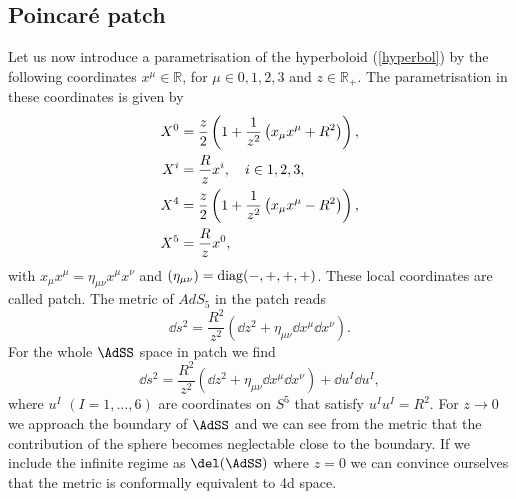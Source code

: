 \subsection{Poincaré patch}\label{p_patch}
Let us now introduce a parametrisation of the hyperboloid (\ref{hyperbol}) by the following coordinates $x^{\mu} \in \mathbb{R}$, for $\mu \in {0,1,2,3}$ and $z \in \mathbb{R}_{+}$. The parametrisation in these coordinates is given by
\begin{align}
X^{0} &= \frac{z}{2} \left( 1+ \frac{1}{z^{2}}\left( x_{\mu}x^{\mu} + R^{2}\right) \right), \notag \\
X^{i} &= \frac{R}{z}x^{i},\quad i\in {1,2,3}, \\
X^{4} &= \frac{z}{2} \left( 1 + \frac{1}{z^{2}} \left(x_{\mu}x^{\mu} -R^{2} \right) \right), \notag \\
X^{5} &= \frac{R}{z}x^{0}, \notag
\end{align}
with $x_{\mu}x^{\mu}=\eta_{\mu\nu}x^{\mu}x^{\nu}$ and $\left(\eta_{\mu \nu}\right) = {\rm diag}(-,+,+,+)$. These local coordinates are called  patch. The metric of $AdS_{5}$ in the  patch reads
\begin{equation}
\dd s^{2} = \frac{R^{2}}{z^{2}}\left(\dd z^{2} + \eta_{\mu \nu} \dd x^{\mu} \dd x^{\nu} \right).
\end{equation}
%
%
For the whole $\AdSS$ space in  patch we find 
%
%
\begin{equation}
\dd s^{2} = \frac{R^{2}}{z^{2}}\left(\dd z^{2} + \eta_{\mu \nu} \dd x^{\mu} \dd x^{\nu} \right) + \dd u^{I}\dd u^{I},
\end{equation}
%
%
where $u^{I}$ $(I=1,\ldots,6)$ are coordinates on $S^{5}$ that satisfy $u^{I}u^{I}=R^{2}$. For $z\to 0$ we approach the boundary of $\AdSS$ and we can see from the metric that the contribution of the sphere becomes neglectable close to the boundary. If we include the infinite regime as $\del (\AdSS)$ where $z=0$ we can convince ourselves that the metric is conformally equivalent to 4d  space.
%
%
%
%
%
%
